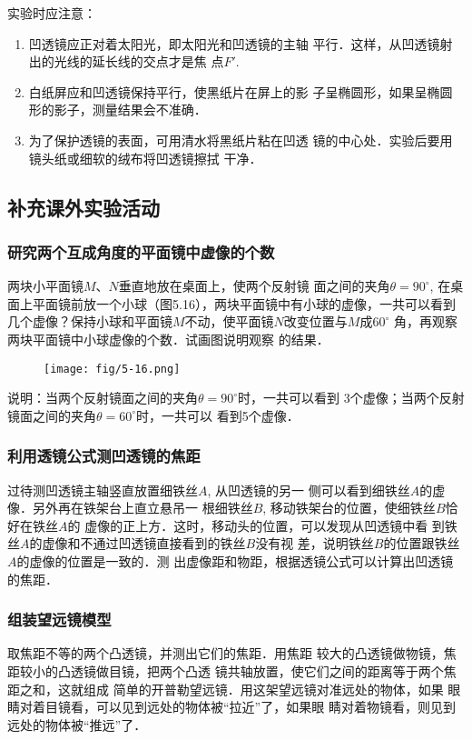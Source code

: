 实验时应注意：
\begin{enumerate}
    \item 凹透镜应正对着太阳光，即太阳光和凹透镜的主轴
平行．这样，从凹透镜射出的光线的延长线的交点才是焦
点$F'$.
\item 白纸屏应和凹透镜保持平行，使黑纸片在屏上的影
子呈椭圆形，如果呈椭圆形的影子，测量结果会不准确．
\item 为了保护透镜的表面，可用清水将黑纸片粘在凹透
镜的中心处．实验后要用镜头纸或细软的绒布将凹透镜擦拭
干净．
\end{enumerate}

\subsection{补充课外实验活动}
\subsubsection{研究两个互成角度的平面镜中虚像的个数}
两块小平面镜$M$、$N$垂直地放在桌面上，使两个反射镜
面之间的夹角$\theta=90^{\circ}$, 在桌面上平面镜前放一个小球（图5.16），两块平面镜中有小球的虚像，一共可以看到几个虚像？保持小球和平面镜$M$不动，使平面镜$N$改变位置与$M$成$60^{\circ}$
角，再观察两块平面镜中小球虚像的个数．试画图说明观察
的结果．
\begin{figure}[htp]
    \centering
    \texttt{[image: fig/5-16.png]}
    \caption{}
\end{figure}

说明：当两个反射镜面之间的夹角$\theta=90^{\circ}$时，一共可以看到
3个虚像；当两个反射镜面之间的夹角$\theta=60^{\circ}$时，一共可以
看到5个虚像．

\subsubsection{利用透镜公式测凹透镜的焦距}
过待测凹透镜主轴竖直放置细铁丝$A$, 从凹透镜的另一
侧可以看到细铁丝$A$的虚像．另外再在铁架台上直立悬吊一
根细铁丝$B$, 移动铁架台的位置，使细铁丝$B$恰好在铁丝$A$的
虚像的正上方．这时，移动头的位置，可以发现从凹透镜中看
到铁丝$A$的虚像和不通过凹透镜直接看到的铁丝$B$没有视
差，说明铁丝$B$的位置跟铁丝$A$的虚像的位置是一致的．测
出虚像距和物距，根据透镜公式可以计算出凹透镜的焦距．

\subsubsection{组装望远镜模型}
取焦距不等的两个凸透镜，并测出它们的焦距．用焦距
较大的凸透镜做物镜，焦距较小的凸透镜做目镜，把两个凸透
镜共轴放置，使它们之间的距离等于两个焦距之和，这就组成
简单的开普勒望远镜．用这架望远镜对准远处的物体，如果
眼睛对着目镜看，可以见到远处的物体被“拉近”了，如果眼
睛对着物镜看，则见到远处的物体被“推远”了．

